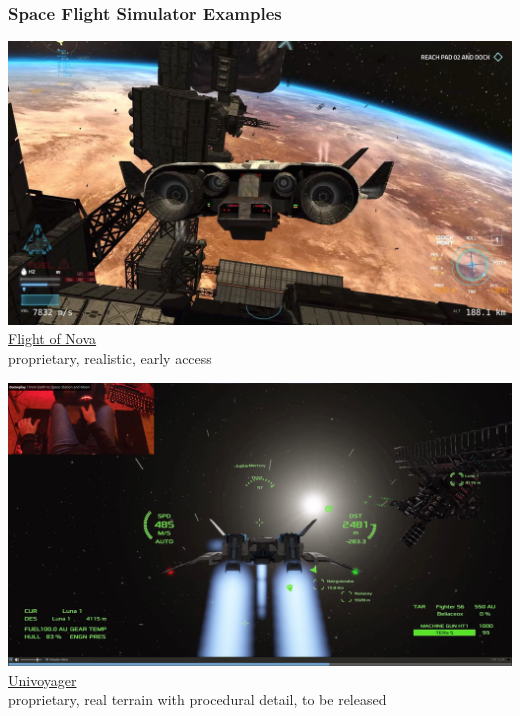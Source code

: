 \documentclass[aspectratio=169,11pt,xcolor=dvipsnames]{beamer}
\begin{document}
\begin{frame}
  \frametitle{Space Flight Simulator Examples}
  \begin{minipage}[t]{0.49\textwidth}
    \begin{center}
      \includegraphics[width=\textwidth]{flight-of-nova}\\
      \href{https://flight-of-nova.com/}{Flight of Nova}\\
      proprietary, realistic, early access
    \end{center}
  \end{minipage}
  \begin{minipage}[t]{0.49\textwidth}
    \begin{center}
      \includegraphics[width=\textwidth]{univoyager}\\
      \href{https://www.univoyager.com/}{Univoyager}\\
      proprietary, real terrain with procedural detail, to be released
    \end{center}
  \end{minipage}
\end{frame}
\end{document}

